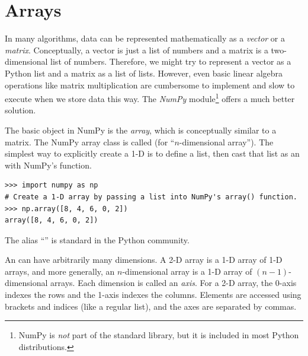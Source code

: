 \label{lab:NumPy}


\section*{Arrays} %

In many algorithms, data can be represented mathematically as a \emph{vector} or a \emph{matrix}.
Conceptually, a vector is just a list of numbers and a matrix is a two-dimensional list of numbers.
Therefore, we might try to represent a vector as a Python list and a matrix as a list of lists.
However, even basic linear algebra operations like matrix multiplication are cumbersome to implement and slow to execute when we store data this way.
The \emph{NumPy} module\footnote{NumPy is \emph{not} part of the standard library, but it is included in most Python distributions.} offers a much better solution.

The basic object in NumPy is the \emph{array}, which is conceptually similar to a matrix.
The NumPy array class is called  (for ``$n$-dimensional array'').
The simplest way to explicitly create a 1-D  is to define a list, then cast that list as an  with NumPy's  function.

\begin{lstlisting}
>>> import numpy as np
# Create a 1-D array by passing a list into NumPy's array() function.
>>> np.array([8, 4, 6, 0, 2])
array([8, 4, 6, 0, 2])
\end{lstlisting}
%
The alias ``'' is standard in the Python community. %

An  can have arbitrarily many dimensions.
A 2-D array is a 1-D array of 1-D arrays, and more generally, an $n$-dimensional array is a 1-D array of $(n-1)$-dimensional arrays.
Each dimension is called an \emph{axis}.
For a 2-D array, the 0-axis indexes the rows and the 1-axis indexes the columns.
Elements are accessed using brackets and indices (like a regular list), and the axes are separated by commas.


